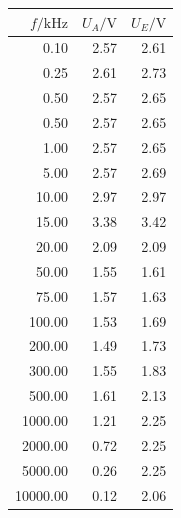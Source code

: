 \documentclass[]{scrartcl}
\begin{document}
\begin{table}[H]
	\centering
	\label{tab:ggverst_c}
	\hskip-1.50cm
	\begin{tabular}{r r r}
		\toprule
		$f / \si{\kilo\hertz}$ & $U_A/\si{\volt}$ & $U_E/\si{\volt}$ \\
		\midrule
		0.10	&	2.57	&	2.61 \\
		0.25	&	2.61	&	2.73 \\
		0.50	&	2.57	&	2.65 \\
		0.50	&	2.57	&	2.65 \\
		1.00	&	2.57	&	2.65 \\
		5.00	&	2.57	&	2.69 \\
		10.00	&	2.97	&	2.97 \\
		15.00	&	3.38	&	3.42 \\
		20.00	&	2.09	&	2.09 \\
		50.00	&	1.55	&	1.61 \\
		75.00	&	1.57	&	1.63 \\
		100.00	&	1.53	&	1.69 \\
		200.00	&	1.49	&	1.73 \\
		300.00	&	1.55	&	1.83 \\
		500.00	&	1.61	&	2.13 \\
		1000.00	&	1.21	&	2.25 \\
		2000.00	&	0.72	&	2.25 \\
		5000.00	&	0.26	&	2.25 \\
		10000.00	&	0.12	&	2.06 \\
		\bottomrule
	\end{tabular}
\end{table}
\end{document}
